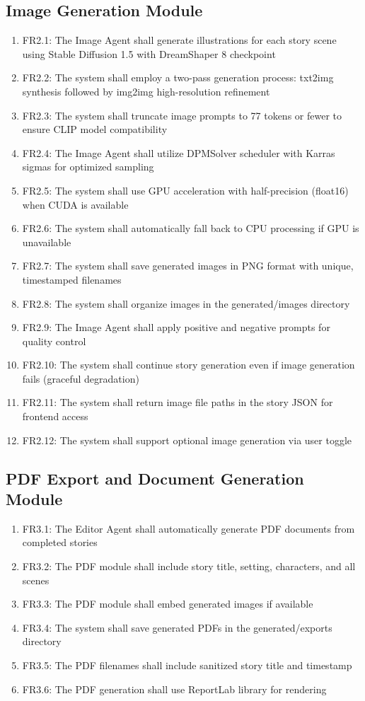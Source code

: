 \subsection{Image Generation Module}
\begin{enumerate}
    \item FR2.1: The Image Agent shall generate illustrations for each story scene using Stable Diffusion 1.5 with DreamShaper 8 checkpoint
    \item FR2.2: The system shall employ a two-pass generation process: txt2img synthesis followed by img2img high-resolution refinement
    \item FR2.3: The system shall truncate image prompts to 77 tokens or fewer to ensure CLIP model compatibility
    \item FR2.4: The Image Agent shall utilize DPMSolver scheduler with Karras sigmas for optimized sampling
    \item FR2.5: The system shall use GPU acceleration with half-precision (float16) when CUDA is available
    \item FR2.6: The system shall automatically fall back to CPU processing if GPU is unavailable
    \item FR2.7: The system shall save generated images in PNG format with unique, timestamped filenames
    \item FR2.8: The system shall organize images in the generated/images directory
    \item FR2.9: The Image Agent shall apply positive and negative prompts for quality control
    \item FR2.10: The system shall continue story generation even if image generation fails (graceful degradation)
    \item FR2.11: The system shall return image file paths in the story JSON for frontend access
    \item FR2.12: The system shall support optional image generation via user toggle
\end{enumerate}

\subsection{PDF Export and Document Generation Module}
\begin{enumerate}
    \item FR3.1: The Editor Agent shall automatically generate PDF documents from completed stories
    \item FR3.2: The PDF module shall include story title, setting, characters, and all scenes
    \item FR3.3: The PDF module shall embed generated images if available
    \item FR3.4: The system shall save generated PDFs in the generated/exports directory
    \item FR3.5: The PDF filenames shall include sanitized story title and timestamp
    \item FR3.6: The PDF generation shall use ReportLab library for rendering
\end{enumerate}

